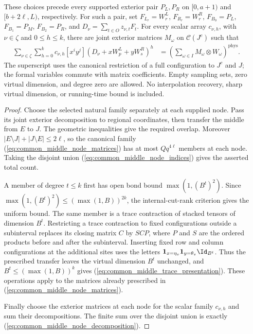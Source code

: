 \begin{lemma}
    These choices precede every supported exterior pair $P_L,P_R$ on
    $[0,a+1)$ and
    $[b+2\ell,L)$, respectively. For such a pair, set
    $F_{L_r}=W^L_r$, $F_{R_r}=W^R_r$,
    $F_{B_0}=P_L$, $F_{B_1}=P_M$, $F_{B_2}=P_R$, and
    $D_\nu=\sum_{t\in O}z_{\nu,t}F_t$.
    For every scalar array $c_{\nu,h}$, with $\nu\in\zeta$ and $0\le h\le k$,
    there are joint exterior matrices $M_\omega$ on $\mathcal C(J^c)$ such that
    \begin{align}
        \sum_{\nu\in\zeta}\sum_{h=0}^{k}
        c_{\nu,h}[x^iy^j](D_\nu+xW^L_p+yW^R_s)^h
         & =\left(\sum_{\omega\in I}M_\omega\otimes W_\omega\right)^{\mathrm{phys}}.
        \label{eq:common_middle_node_decomposition}
    \end{align}
    The superscript uses the canonical restriction of a full configuration
    to $J^c$ and $J$; the formal variables commute with matrix coefficients.
    Empty sampling sets, zero virtual dimension, and degree zero are allowed.
    No interpolation recovery, sharp virtual dimension, or running-time bound
    is included.
\end{lemma}
\begin{proof}\leanok
    Choose the selected natural family separately at each supplied node.
    Pass its joint exterior decomposition to regional coordinates, then
    transfer the middle from $E$ to $J$. The geometric inequalities give the
    required overlap. Moreover $|E\setminus J|+|J\setminus E|\le2\ell$,
    so the canonical family (\ref{eq:common_middle_node_matrices}) has at most
    $Qq^{4\ell}$ members at each node. Taking the disjoint union
    (\ref{eq:common_middle_node_indices}) gives the asserted total count.

    A member of degree $t\le k$ first has open bond bound
    $\max(1,(B^t)^2)$. Since
    $\max(1,(B^t)^2)\le(\max(1,B))^{2k}$, the internal-cut-rank criterion
    gives the uniform bound. The same member is a trace contraction of
    stacked tensors of dimension $B^t$. Restricting a trace contraction to
    fixed configurations outside a subinterval replaces its closing matrix
    $C$ by $SCP$, where $P$ and $S$ are the ordered products before and after
    the subinterval. Inserting fixed row and column configurations at the
    additional sites uses the letters
    $\mathbf1_{x=\eta_v}\mathbf1_{y=\theta_v}\Id_{B^t}$.
    Thus the prescribed transfer leaves the virtual dimension $B^t$ unchanged,
    and $B^t\le(\max(1,B))^k$ gives
    (\ref{eq:common_middle_trace_presentation}).
    These operations apply to the matrices already prescribed in
    (\ref{eq:common_middle_node_matrices}).

    Finally choose the exterior matrices at each
    node for the scalar family $c_{\nu,h}$ and sum their decompositions.
    The finite sum over the disjoint union is exactly
    (\ref{eq:common_middle_node_decomposition}).
\end{proof}
